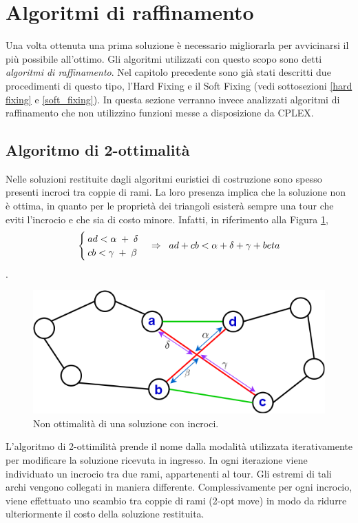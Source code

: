 \section{Algoritmi di raffinamento}
Una volta ottenuta una prima soluzione è necessario migliorarla per avvicinarsi il più possibile all'ottimo. Gli algoritmi utilizzati con questo scopo sono detti \textit{algoritmi di raffinamento}. Nel capitolo precedente sono già stati descritti due procedimenti di questo tipo, l'Hard Fixing e il Soft Fixing (vedi sottosezioni \ref{hard fixing} e \ref{soft_fixing}). In questa sezione verranno invece analizzati algoritmi di raffinamento che non utilizzino funzioni messe a disposizione da CPLEX.

\subsection{Algoritmo di 2-ottimalità}
Nelle soluzioni restituite dagli algoritmi euristici di costruzione sono spesso presenti incroci tra coppie di rami. La loro presenza implica che la soluzione non è ottima, in quanto per le proprietà dei triangoli esisterà sempre una tour che eviti l'incrocio e che sia di costo minore. Infatti, in riferimento alla Figura \ref{cross},
\begin{equation}
\begin{cases}
ad < \alpha \;+\; \delta \\ \notag
cb < \gamma \;+\; \beta
\end{cases} 
\Rightarrow
\;\;ad+cb<\alpha + \delta +\gamma + beta
\end{equation}. 
\begin{figure}[H] 
\begin{center} 
  \includegraphics[scale=0.5]{Images/triangle_property}
  \caption{\footnotesize{Non ottimalità di una soluzione con incroci.}}
  \label{cross}
\end{center}
\end{figure}
L'algoritmo di 2-ottimilità prende il nome dalla modalità utilizzata iterativamente per modificare la soluzione ricevuta in ingresso. In ogni iterazione viene individuato un incrocio tra due rami, appartenenti al tour. Gli estremi di tali archi vengono collegati in maniera differente. Complessivamente per ogni incrocio, viene effettuato uno scambio tra coppie di rami (2-opt move) in modo da ridurre ulteriormente il costo della soluzione restituita.\\

